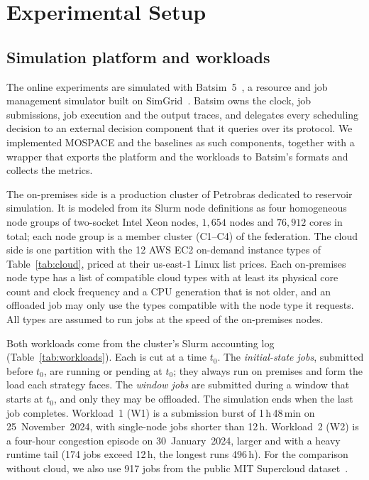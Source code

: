 \documentclass[conference]{IEEEtran}
\begin{document}
\section{Experimental Setup}
\label{sec:experimental_setup}

\subsection{Simulation platform and workloads}

The online experiments are simulated with Batsim~5~\cite{batsim_jsspp16}, a resource and job management simulator built on SimGrid~\cite{Casanova2014}. Batsim owns the clock, job submissions, job execution and the output traces, and delegates every scheduling decision to an external decision component that it queries over its protocol. We implemented MOSPACE and the baselines as such components, together with a wrapper that exports the platform and the workloads to Batsim's formats and collects the metrics.

The on-premises side is a production cluster of Petrobras dedicated to reservoir simulation. It is modeled from its Slurm node definitions as four homogeneous node groups of two-socket Intel Xeon nodes, $1{,}654$ nodes and $76{,}912$ cores in total; each node group is a member cluster (C1--C4) of the federation. The cloud side is one partition with the 12 AWS EC2 on-demand instance types of Table~\ref{tab:cloud}, priced at their us-east-1 Linux list prices. Each on-premises node type has a list of compatible cloud types with at least its physical core count and clock frequency and a CPU generation that is not older, and an offloaded job may only use the types compatible with the node type it requests. All types are assumed to run jobs at the speed of the on-premises nodes.

Both workloads come from the cluster's Slurm accounting log (Table~\ref{tab:workloads}). Each is cut at a time $t_0$. The \emph{initial-state jobs}, submitted before $t_0$, are running or pending at $t_0$; they always run on premises and form the load each strategy faces. The \emph{window jobs} are submitted during a window that starts at $t_0$, and only they may be offloaded. The simulation ends when the last job completes. Workload~1 (W1) is a submission burst of 1\,h\,48\,min on 25~November~2024, with single-node jobs shorter than 12\,h. Workload~2 (W2) is a four-hour congestion episode on 30~January~2024, larger and with a heavy runtime tail (174 jobs exceed 12\,h, the longest runs 496\,h). For the comparison without cloud, we also use 917 jobs from the public MIT Supercloud dataset~\cite{Samsi2021}. 
\end{document}
